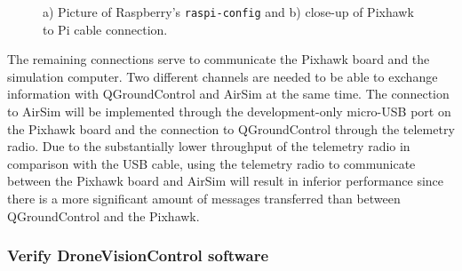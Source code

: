\begin{figure}
  \centering
  \caption{a) Picture of Raspberry's \texttt{raspi-config} and b) close-up of Pixhawk to Pi cable connection.}
  \label{fig:serial-connection}
\end{figure}


The remaining connections serve to communicate the Pixhawk board and the simulation computer. Two different channels are needed to be able to exchange information with QGroundControl and AirSim at the same time. The connection to AirSim will be implemented through the development-only micro-USB port on the Pixhawk board and the connection to QGroundControl through the telemetry radio. Due to the substantially lower throughput of the telemetry radio in comparison with the USB cable, using the telemetry radio to communicate between the Pixhawk board and AirSim will result in inferior performance since there is a more significant amount of messages transferred than between QGroundControl and the Pixhawk.



\subsubsection{Verify DroneVisionControl software}


